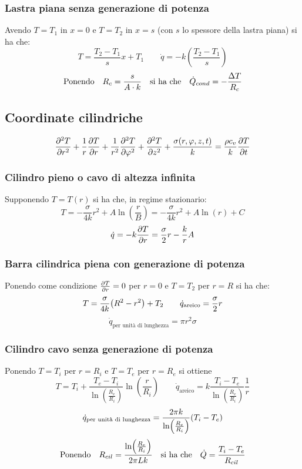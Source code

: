\subsubsection{Lastra piana senza generazione di potenza}
Avendo $T=T_1$ in $x=0$ e $T = T_2$ in $x=s$ (con $s$ lo spessore della lastra piana) si ha che:
\[ T = \frac{T_2 - T_1}{s}x + T_1 \qquad \dot{q} = -k \left(\frac{T_2 - T_1}{s} \right) \]
\[\qq*{Ponendo} R_c = \frac{s}{A \cdot k} \qq{si ha che} \dot{Q}_{cond} = -\frac{\Delta T}{R_c}\]

\subsection{Coordinate cilindriche}
\[ \pdv[2]{T}{r} + \frac{1}{r}\pdv{T}{r} + \frac{1}{r^2}\pdv[2]{T}{\varphi} + \pdv[2]{T}{z} + \frac{\sigma(r,\varphi,z,t)}{k} = \frac{\rho c_v}{k} \pdv{T}{t} \]

\subsubsection{Cilindro pieno o cavo di altezza infinita}
Supponendo $T=T(r)$ si ha che, in regime stazionario:
\[T = -\frac{\sigma}{4k}r^2 + A\ln(\frac{r}{B}) = -\frac{\sigma}{4k}r^2 + A\ln(r) + C \]
\[\dot{q} = -k \pdv{T}{r} = \frac{\sigma}{2}r - \frac{k}{r}A \]

\subsubsection{Barra cilindrica piena con generazione di potenza}
Ponendo come condizione $\pdv{T}{r} = 0$ per $r = 0$ e $T = T_2$ per $r = R$ si ha che:
\[T = \frac{\sigma}{4k}\qty(R^2-r^2) + T_2 \qquad \dot{q}_{\text{areico}} = \frac{\sigma}{2}r \]
\[\dot{q}_{\text{per unità di lunghezza}} = \pi r^2 \sigma \]

\subsubsection{Cilindro cavo senza generazione di potenza}
Ponendo $T = T_i$ per $r = R_i$ e $T = T_e$ per $r = R_e$ si ottiene
\[T = T_i + \frac{T_e - T_i}{\ln(\frac{R_e}{R_i})}\ln(\frac{r}{R_i}) \qquad \dot{q}_{\text{areico}} = k \frac{T_i-T_e}{\ln(\frac{R_e}{R_i})}\frac{1}{r}\]
\[\dot{q}_{\text{per unità di lunghezza}} = \frac{2\pi k}{\ln(\frac{R_e}{R_i})}\qty(T_i - T_e) \]
\[\qq*{Ponendo} R_{cil} = \frac{\ln(\frac{R_e}{R_i})}{2\pi L k} \qq{si ha che} \dot{Q} = \frac{T_i-T_e}{R_{cil}}\]

